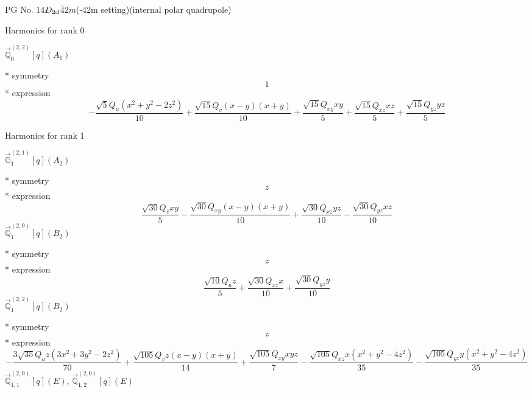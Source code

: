 \documentclass[fleqn,8pt]{jsarticle}
\begin{document}
\setcounter{MaxMatrixCols}{32}

\renewcommand{\tablename}{Table~}
\renewcommand{\figurename}{Figure~}
\begin{center}
\LARGE
PG No. 14\quad$D_{\rm 2d}$\quad$\bar{4}2m$\quad(-42m setting)\quad[ tetragonal ] (internal polar quadrupole)
\end{center}

\noindent * Harmonics for rank 0

\noindent\quad $\vec{\mathbb{Q}}_{0}^{(2,2)}[q](A_{1})$

\noindent\quad ** symmetry
\begin{dmath*}
1
\end{dmath*}
\noindent\quad ** expression
\begin{dmath*}
- \frac{\sqrt{5} Q_{u} \left(x^{2} + y^{2} - 2 z^{2}\right)}{10} + \frac{\sqrt{15} Q_{v} \left(x - y\right) \left(x + y\right)}{10} + \frac{\sqrt{15} Q_{xy} x y}{5} + \frac{\sqrt{15} Q_{xz} x z}{5} + \frac{\sqrt{15} Q_{yz} y z}{5}
\end{dmath*}

\noindent * Harmonics for rank 1

\noindent\quad $\vec{\mathbb{G}}_{1}^{(2,1)}[q](A_{2})$

\noindent\quad ** symmetry
\begin{dmath*}
z
\end{dmath*}
\noindent\quad ** expression
\begin{dmath*}
\frac{\sqrt{30} Q_{v} x y}{5} - \frac{\sqrt{30} Q_{xy} \left(x - y\right) \left(x + y\right)}{10} + \frac{\sqrt{30} Q_{xz} y z}{10} - \frac{\sqrt{30} Q_{yz} x z}{10}
\end{dmath*}
\noindent\quad $\vec{\mathbb{Q}}_{1}^{(2,0)}[q](B_{2})$

\noindent\quad ** symmetry
\begin{dmath*}
z
\end{dmath*}
\noindent\quad ** expression
\begin{dmath*}
\frac{\sqrt{10} Q_{u} z}{5} + \frac{\sqrt{30} Q_{xz} x}{10} + \frac{\sqrt{30} Q_{yz} y}{10}
\end{dmath*}
\noindent\quad $\vec{\mathbb{Q}}_{1}^{(2,2)}[q](B_{2})$

\noindent\quad ** symmetry
\begin{dmath*}
z
\end{dmath*}
\noindent\quad ** expression
\begin{dmath*}
- \frac{3 \sqrt{35} Q_{u} z \left(3 x^{2} + 3 y^{2} - 2 z^{2}\right)}{70} + \frac{\sqrt{105} Q_{v} z \left(x - y\right) \left(x + y\right)}{14} + \frac{\sqrt{105} Q_{xy} x y z}{7} - \frac{\sqrt{105} Q_{xz} x \left(x^{2} + y^{2} - 4 z^{2}\right)}{35} - \frac{\sqrt{105} Q_{yz} y \left(x^{2} + y^{2} - 4 z^{2}\right)}{35}
\end{dmath*}
\noindent\quad $\vec{\mathbb{Q}}_{1,1}^{(2,0)}[q](E)$, $\vec{\mathbb{Q}}_{1,2}^{(2,0)}[q](E)$
\end{document}
